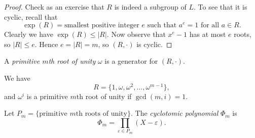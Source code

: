 \begin{proof}
  Check as an exercise that $R$ is indeed a subgroup of $L$.
  To see that it is cyclic, recall that
  \[
    \exp(R) = \text{smallest positive integer $e$ such that $a^e = 1$ for all $a \in R$}.
  \]
  Clearly we have $\exp(R) \le |R|$. Now observe that
  $x^e - 1$ has at
  most $e$ roots, so $|R| \le e$. Hence
  $e = |R| = m$, so $(R, \cdot)$ is cyclic.
\end{proof}

\begin{definition}
  A \emph{primitive $m$th root of unity} $\omega$ is a
  generator for $(R, \cdot)$.
\end{definition}

\begin{remark}
  We have
  \[
    R = \{1, \omega, \omega^2, \dots, \omega^{m - 1}\},
  \]
  and $\omega^i$ is a primitive $m$th root of unity if
  $\gcd(m, i) = 1$.
\end{remark}

\begin{definition}
  Let $P_m = \{\text{primitive $m$th roots of unity}\}$.
  The \emph{cyclotomic polynomial} $\Phi_m$ is
  \[
    \Phi_m = \prod_{\varepsilon \in P_m} (X - \varepsilon).
  \]
\end{definition}
